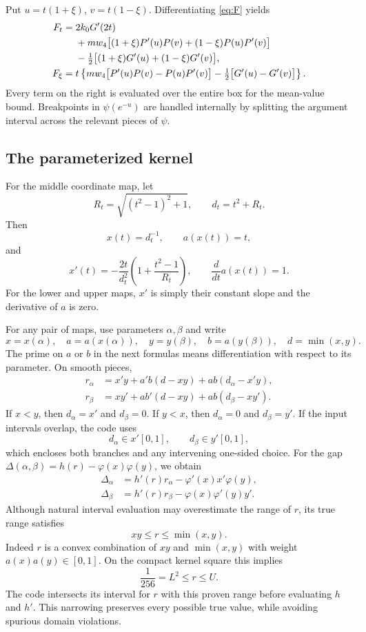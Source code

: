 \documentclass[11pt]{article}
\theoremstyle{remark}
\begin{document}
Put \(u=t(1+\xi)\), \(v=t(1-\xi)\).
Differentiating \eqref{eq:F} yields
\begin{align}
F_t={}&2k_0G'(2t)\notag\\
&+mw_4\bigl[(1+\xi)P'(u)P(v)
 +(1-\xi)P(u)P'(v)\bigr]\notag\\
&-\tfrac12\bigl[(1+\xi)G'(u)+(1-\xi)G'(v)\bigr],
\label{eq:Ft}\\
F_\xi={}&t\left\{
mw_4\bigl[P'(u)P(v)-P(u)P'(v)\bigr]
-\tfrac12\bigl[G'(u)-G'(v)\bigr]\right\}.
\label{eq:Fxi}
\end{align}
Every term on the right is evaluated over the entire box for the
mean-value bound. Breakpoints in \(\psi(e^{-u})\) are handled
internally by splitting the argument interval across the relevant
pieces of \(\psi\).

\subsection{The parameterized kernel}
For the middle coordinate map, let
\[
R_t=\sqrt{(t^2-1)^2+1},\qquad d_t=t^2+R_t.
\]
Then
\[
x(t)=d_t^{-1},\qquad a(x(t))=t,
\]
and
\begin{equation}\label{eq:coordinate-derivative}
x'(t)=-\frac{2t}{d_t^2}
\left(1+\frac{t^2-1}{R_t}\right),\qquad
\frac{d}{dt}a(x(t))=1.
\end{equation}
For the lower and upper maps, \(x'\) is simply their constant
slope and the derivative of \(a\) is zero.

For any pair of maps, use parameters \(\alpha,\beta\) and write
\[
x=x(\alpha),\quad a=a(x(\alpha)),\quad
y=y(\beta),\quad b=a(y(\beta)),\quad d=\min(x,y).
\]
The prime on \(a\) or \(b\) in the next formulas means differentiation
with respect to its parameter. On smooth pieces,
\begin{align*}
r_\alpha&=x'y+a'b(d-xy)+ab(d_\alpha-x'y),\\
r_\beta&=xy'+ab'(d-xy)+ab(d_\beta-xy').
\end{align*}
If \(x<y\), then \(d_\alpha=x'\) and \(d_\beta=0\).
If \(y<x\), then \(d_\alpha=0\) and \(d_\beta=y'\).
If the input intervals overlap, the code uses
\[
d_\alpha\in x'[0,1],\qquad d_\beta\in y'[0,1],
\]
which encloses both branches and any intervening one-sided choice.
For the gap
\(\Delta(\alpha,\beta)=h(r)-\varphi(x)\varphi(y)\), we obtain
\begin{align*}
\Delta_\alpha&=h'(r)r_\alpha-\varphi'(x)x'\varphi(y),\\
\Delta_\beta&=h'(r)r_\beta-\varphi(x)\varphi'(y)y'.
\end{align*}
Although natural interval evaluation may overestimate the range
of \(r\), its true range satisfies
\[
xy\le r\le\min(x,y).
\]
Indeed \(r\) is a convex combination of \(xy\) and \(\min(x,y)\)
with weight \(a(x)a(y)\in[0,1]\). On the compact kernel square
this implies
\[
\frac1{256}=L^2\le r\le U.
\]
The code intersects its interval for \(r\) with this proven range
before evaluating \(h\) and \(h'\). This narrowing preserves every
possible true value, while avoiding spurious domain violations.
\end{document}
